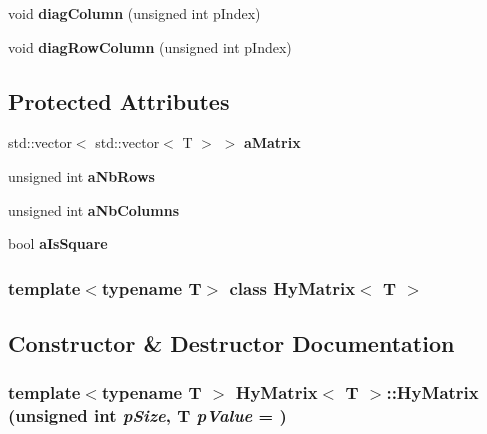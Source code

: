 \begin{DoxyCompactItemize}
\item 
\hypertarget{classHyMatrix_ab62629c9d24b76668598e5860822ba3e}{
void {\bfseries diagColumn} (unsigned int pIndex)}
\label{classHyMatrix_ab62629c9d24b76668598e5860822ba3e}

\item 
\hypertarget{classHyMatrix_a996225fd92d1311f060dcd34fa0931e8}{
void {\bfseries diagRowColumn} (unsigned int pIndex)}
\label{classHyMatrix_a996225fd92d1311f060dcd34fa0931e8}

\end{DoxyCompactItemize}
\subsection*{Protected Attributes}
\begin{DoxyCompactItemize}
\item 
\hypertarget{classHyMatrix_a3a882d14100838832af32d17add61860}{
std::vector$<$ std::vector$<$ T $>$ $>$ {\bfseries aMatrix}}
\label{classHyMatrix_a3a882d14100838832af32d17add61860}

\item 
\hypertarget{classHyMatrix_aeb1d576ca4b1b68cf0afb0d67b439502}{
unsigned int {\bfseries aNbRows}}
\label{classHyMatrix_aeb1d576ca4b1b68cf0afb0d67b439502}

\item 
\hypertarget{classHyMatrix_a8b75c7990c27cc04434ad3cce410ad4c}{
unsigned int {\bfseries aNbColumns}}
\label{classHyMatrix_a8b75c7990c27cc04434ad3cce410ad4c}

\item 
\hypertarget{classHyMatrix_a92656055bda39706f39de6566ff33065}{
bool {\bfseries aIsSquare}}
\label{classHyMatrix_a92656055bda39706f39de6566ff33065}

\end{DoxyCompactItemize}
\subsubsection*{template$<$typename T$>$ class HyMatrix$<$ T $>$}



\subsection{Constructor \& Destructor Documentation}
\hypertarget{classHyMatrix_a7e6eff97c9a87088513c587b73eafde0}{
\subsubsection[{HyMatrix}]{\setlength{\rightskip}{0pt plus 5cm}template$<$typename T $>$ {\bf HyMatrix}$<$ T $>$::{\bf HyMatrix} (unsigned int {\em pSize}, \/  T {\em pValue} = {})}}
\label{classHyMatrix_a7e6eff97c9a87088513c587b73eafde0}


